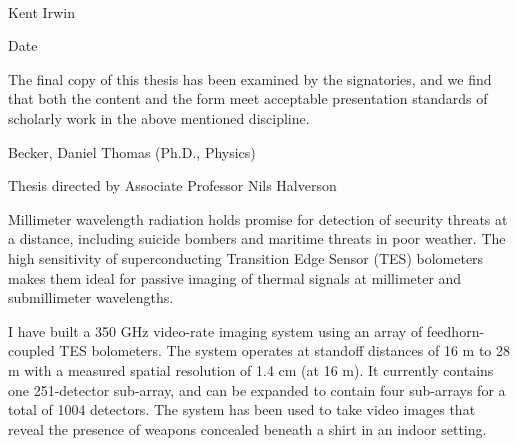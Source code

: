 \documentclass[12pt,letterpaper]{memoir}
\numberwithin{equation}{chapter}
\numberwithin{figure}{chapter}
\numberwithin{table}{chapter}
\begin{document}
\begin{center}
  \normalsize
  \vspace*{16mm}
  \vrule width 80mm height 0.2mm\\
  Kent Irwin
\end{center}

\vspace*{9mm}

\begin{flushright}
  Date~{\vrule width 55mm height 0.2mm}
\end{flushright}

\vspace*{\fill}
\begin{center}
  \SingleSpacing
  \parbox{5.0in}{
  The final copy of this thesis has been examined by
  the signatories, and we find that both the content
  and the form meet acceptable presentation standards
  of scholarly work in the above mentioned discipline.}
\end{center}
\vspace*{\fill}
\newpage



\begin{flushleft}
Becker, Daniel Thomas (Ph.D., Physics)

\thesistitle

Thesis directed by Associate Professor Nils Halverson
\end{flushleft}

\vspace*{0.7cm}

Millimeter wavelength radiation holds promise for detection of security threats at a distance, including suicide bombers and maritime threats in poor weather.
The high sensitivity of superconducting Transition Edge Sensor (TES) bolometers makes them ideal for passive imaging of thermal signals at millimeter and submillimeter wavelengths.

I have built a 350 GHz video-rate imaging system using an array of feedhorn-coupled TES bolometers.
The system operates at standoff distances of 16 m to 28 m with a measured spatial resolution of 1.4 cm (at 16 m).
It currently contains one 251-detector sub-array, and can be expanded to contain four sub-arrays for a total of 1004 detectors.
The system has been used to take video images that reveal the presence of weapons concealed beneath a shirt in an indoor setting.
\end{document}
